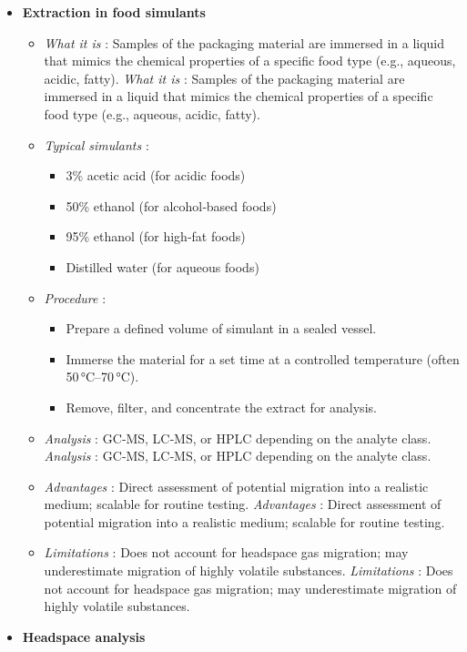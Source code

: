 \documentclass[11pt,a4paper]{article}
\begin{document}
\begin{itemize}
\item 
\textbf{Extraction in food simulants}
  \begin{itemize}
\item \textit{What it is} : Samples of the packaging material are immersed in a liquid that mimics the chemical properties of a specific food type (e.g., aqueous, acidic, fatty).
\textit{What it is} : Samples of the packaging material are immersed in a liquid that mimics the chemical properties of a specific food type (e.g., aqueous, acidic, fatty).
\item 
\textit{Typical simulants} :
    \begin{itemize}
\item 3\% acetic acid (for acidic foods)
\item 50\% ethanol (for alcohol‑based foods)
\item 95\% ethanol (for high‑fat foods)
\item Distilled water (for aqueous foods)
    \end{itemize}
\item 
\textit{Procedure} :
    \begin{itemize}
\item Prepare a defined volume of simulant in a sealed vessel.
\item Immerse the material for a set time at a controlled temperature (often 50 °C–70 °C).
\item Remove, filter, and concentrate the extract for analysis.
    \end{itemize}
\item \textit{Analysis} : GC‑MS, LC‑MS, or HPLC depending on the analyte class.
\textit{Analysis} : GC‑MS, LC‑MS, or HPLC depending on the analyte class.
\item \textit{Advantages} : Direct assessment of potential migration into a realistic medium; scalable for routine testing.
\textit{Advantages} : Direct assessment of potential migration into a realistic medium; scalable for routine testing.
\item \textit{Limitations} : Does not account for headspace gas migration; may underestimate migration of highly volatile substances.
\textit{Limitations} : Does not account for headspace gas migration; may underestimate migration of highly volatile substances.
  \end{itemize}
\item 
\textbf{Headspace analysis}
  \begin{itemize}

\end{itemize}
\end{itemize}
\end{document}
